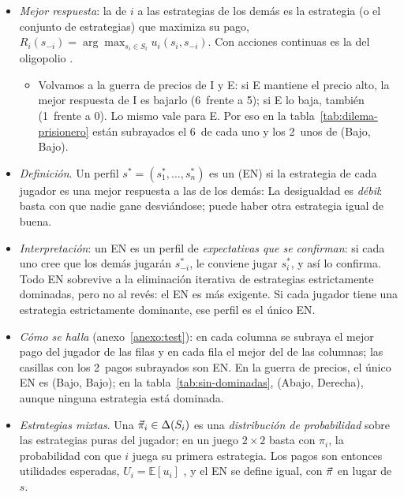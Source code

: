 \documentclass[11pt]{article}
\begin{document}
\begin{itemize}
\item \emph{Mejor respuesta}: la  de $i$ a las estrategias de los demás es la estrategia (o el conjunto de estrategias) que maximiza su pago, $R_i(s_{-i})=\arg\max_{s_i\in S_i}u_i(s_i,s_{-i})$. Con acciones continuas es la  del oligopolio .
  \begin{itemize}
  \item Volvamos a la guerra de precios de \textup{I} y E: si E mantiene el precio alto, la mejor respuesta de \textup{I} es bajarlo (6~frente a 5); si E lo baja, también (1~frente a 0). Lo mismo vale para E. Por eso en la tabla~\ref{tab:dilema-prisionero} están subrayados el 6~de cada uno y los 2~unos de (Bajo, Bajo).
  \end{itemize}
\item \emph{Definición}\nocite{Nash1950Equilibrium}. Un perfil $s^*=(s_1^*,\dots,s_n^*)$ es un  (EN) si la estrategia de cada jugador es una mejor respuesta a las de los demás:
  La desigualdad es \emph{débil}: basta con que nadie gane desviándose; puede haber otra estrategia igual de buena.
\item \emph{Interpretación}: un EN es un perfil de \emph{expectativas que se confirman}: si cada uno cree que los demás jugarán $s_{-i}^*$, le conviene jugar $s_i^*$, y así lo confirma. Todo EN sobrevive a la eliminación iterativa de estrategias estrictamente dominadas, pero no al revés: el EN es más exigente. Si cada jugador tiene una estrategia estrictamente dominante, ese perfil es el único EN.
\item \emph{Cómo se halla} (anexo~\ref{anexo:test}): en cada columna se subraya el mejor pago del jugador de las filas y en cada fila el mejor del de las columnas; las casillas con los 2~pagos subrayados son EN. En la guerra de precios, el único EN es (Bajo, Bajo); en la tabla~\ref{tab:sin-dominadas}, (Abajo, Derecha), aunque ninguna estrategia está dominada.
\item \emph{Estrategias mixtas}. Una  $\vec{\pi}_i\in\Delta(S_i)$ es una \emph{distribución de probabilidad} sobre las estrategias puras del jugador; en un juego $2\times2$ basta con $\pi_i$, la probabilidad con que $i$ juega su primera estrategia. Los pagos son entonces utilidades esperadas, $U_i=\mathbb{E}[u_i]$ , y el EN se define igual, con $\vec{\pi}$ en lugar de $s$.

\end{itemize}
\end{document}
